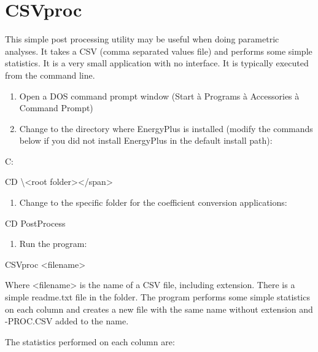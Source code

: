 \chapter{CSVproc}\label{csvproc}

This simple post processing utility may be useful when doing parametric analyses. It takes a CSV (comma separated values file) and performs some simple statistics. It is a very small application with no interface. It is typically executed from the command line.

\begin{enumerate}
\def\labelenumi{\arabic{enumi})}
\item
  Open a DOS command prompt window (Start à Programs à Accessories à Command Prompt)
\item
  Change to the directory where EnergyPlus is installed (modify the commands below if you did not install EnergyPlus in the default install path):
\end{enumerate}

C:

CD \textbackslash{}\textless{}root folder\textgreater{}\textless{}/span\textgreater{}

\begin{enumerate}
\def\labelenumi{\arabic{enumi})}
\setcounter{enumi}{2}
\tightlist
\item
  Change to the specific folder for the coefficient conversion applications:
\end{enumerate}

CD PostProcess

\begin{enumerate}
\def\labelenumi{\arabic{enumi})}
\setcounter{enumi}{3}
\tightlist
\item
  Run the program:
\end{enumerate}

CSVproc \textless{}filename\textgreater{}

Where \textless{}filename\textgreater{} is the name of a CSV file, including extension. There is a simple readme.txt file in the folder. The program performs some simple statistics on each column and creates a new file with the same name without extension and -PROC.CSV added to the name.

The statistics performed on each column are:

